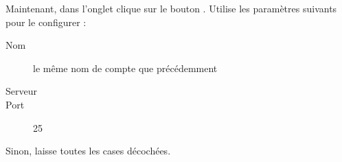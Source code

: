 Maintenant, dans l'onglet  clique sur le
bouton . Utilise les param\`etres suivants pour le
configurer :
\begin{description}
  \item[Nom] le m\^eme nom de compte que pr\'ec\'edemment
  \item[Serveur] 
  \item[Port] 25
\end{description}
Sinon, laisse toutes les cases d\'ecoch\'ees.

%
%


